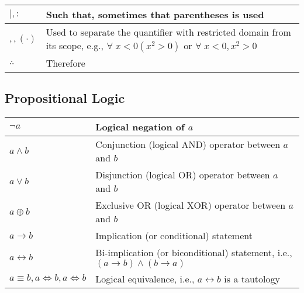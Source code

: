 \begin{xltabular}{\textwidth}{XX}
	\(\mid, :\)                  & Such that, sometimes that parentheses is used \cite{grahamConcreteMathematicsFoundation1989}                                                                                                                 \\ \hline
	\(, , \left( \cdot \right)\) & Used to separate the quantifier with restricted domain from its scope, e.g., \(\forall \; x < 0 \left( x^{2} > 0 \right)\) or \(\forall \; x < 0, x^{2} > 0\) \cite{grahamConcreteMathematicsFoundation1989} \\ \hline
	\(\therefore\)               & Therefore \cite{grahamConcreteMathematicsFoundation1989}                                                                                                                                                     \\
\end{xltabular}

\subsection{Propositional Logic}
\begin{xltabular}{\textwidth}{XX}
	\(\lnot a\)                                    & Logical negation of \(a\) \cite{rosenDiscreteMathematicsIts2011}                                                                                       \\ \hline
	\(a \wedge b\)                                 & Conjunction (logical AND) operator between \(a\) and \(b\)\cite{rosenDiscreteMathematicsIts2011}                                                       \\ \hline
	\(a \vee b\)                                   & Disjunction (logical OR) operator between \(a\) and \(b\)\cite{rosenDiscreteMathematicsIts2011}                                                        \\ \hline
	\(a \oplus b\)                                 & Exclusive OR (logical XOR) operator between \(a\) and \(b\)\cite{rosenDiscreteMathematicsIts2011}                                                      \\ \hline
	\(a \rightarrow b\)                            & Implication (or conditional) statement\cite{rosenDiscreteMathematicsIts2011}                                                                           \\ \hline
	\(a \leftrightarrow b\)                        & Bi-implication (or biconditional) statement, i.e., \(\left( a \rightarrow b \right) \wedge (b \rightarrow a )\) \cite{rosenDiscreteMathematicsIts2011} \\ \hline
	\(a \equiv b, a \iff b, a \Leftrightarrow b \) & Logical equivalence, i.e., \(a \leftrightarrow b\) is a tautology\cite{rosenDiscreteMathematicsIts2011}                                                \\
\end{xltabular}

